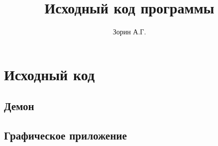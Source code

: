 \documentclass[14pt,a4paper]{report}
\author{Зорин А.Г.}
\title{Исходный код программы}
\begin{document}
\maketitle
\renewcommand{\thesection}{\arabic{section}}
\tableofcontents
\pagebreak

\section{Исходный код}
\subsection{Демон}






\subsection{Графическое приложение}











 








\end{document}
